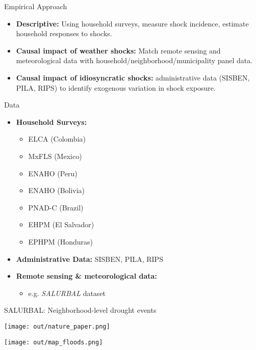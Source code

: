 \documentclass[aspectratio = 169]{beamer}
\begin{document}
  
  \begin{frame}{Empirical Approach}
	\begin{itemize}
	  \item \textbf{Descriptive:} Using household surveys, measure shock incidence, estimate household responses to shocks.
	  \bigskip 
	  
	  \item \textbf{Causal impact of weather shocks:} Match remote sensing and meteorological data with household/neighborhood/municipality panel data. 	
	  \bigskip 

	  \item \textbf{Causal impact of idiosyncratic shocks:}  administrative data (SISBEN, PILA, RIPS) to identify exogenous variation in shock exposure.
	\end{itemize}
  \end{frame}
  
  \begin{frame}{Data}
	\begin{itemize}
	  \item \textbf{Household Surveys:}
	  \begin{itemize}
		\item ELCA (Colombia)
		\item MxFLS (Mexico)
		\item ENAHO (Peru)
		\item ENAHO (Bolivia)
		\item PNAD-C (Brazil)
		\item EHPM (El Salvador)
		\item EPHPM (Honduras)
	  \end{itemize}
	  \bigskip

	  \item \textbf{Administrative Data:} SISBEN, PILA, RIPS
	  \bigskip 

	  \item \textbf{Remote sensing \& meteorological data:} 
	  \begin{itemize}
			\item e.g. \emph{SALURBAL} dataset
	  \end{itemize}
	\end{itemize}
  \end{frame}
  
\begin{frame}{SALURBAL: Neighborhood-level drought events}
  \begin{minipage}{0.48\textwidth}
	\centering
	\texttt{[image: out/nature\_paper.png]}
\end{minipage}
\hfill
\begin{minipage}{0.48\textwidth}
	\centering
	\texttt{[image: out/map\_floods.png]}
\end{minipage}
\end{frame}
\end{document}
